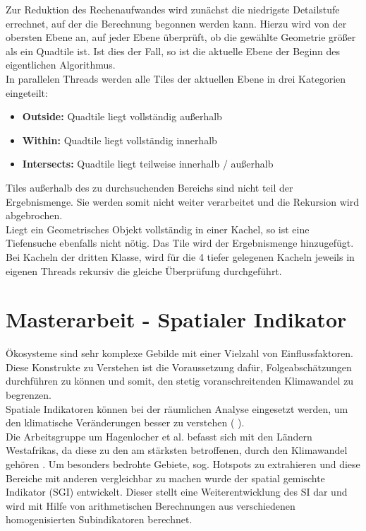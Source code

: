 \documentclass[10pt,conference,compsocconf]{IEEEtran}
\begin{document}
Zur Reduktion des Rechenaufwandes wird zunächst die niedrigste Detailstufe errechnet, auf der die Berechnung begonnen werden kann. Hierzu wird von der obersten Ebene an, auf jeder Ebene überprüft, ob die gewählte Geometrie größer als ein Quadtile ist. Ist dies der Fall, so ist die aktuelle Ebene der Beginn des eigentlichen Algorithmus.\\
In parallelen Threads werden alle Tiles der aktuellen Ebene in drei Kategorien eingeteilt:
\begin{itemize}
	\item \textbf{Outside:} Quadtile liegt vollständig außerhalb
	\item \textbf{Within:} Quadtile liegt vollständig innerhalb
	\item \textbf{Intersects:} Quadtile liegt teilweise innerhalb / außerhalb
\end{itemize}
Tiles außerhalb des zu durchsuchenden Bereichs sind nicht teil der Ergebnismenge. Sie werden somit nicht weiter verarbeitet und die Rekursion wird abgebrochen.\\
Liegt ein Geometrisches Objekt vollständig in einer Kachel, so ist eine Tiefensuche ebenfalls nicht nötig. Das Tile wird der Ergebnismenge hinzugefügt.\\
Bei Kacheln der dritten Klasse, wird für die 4 tiefer gelegenen Kacheln jeweils in eigenen Threads rekursiv die gleiche Überprüfung durchgeführt.\\



\section{Masterarbeit - Spatialer Indikator}
Ökosysteme sind sehr komplexe Gebilde mit einer Vielzahl von Einflussfaktoren. Diese Konstrukte zu Verstehen ist die Voraussetzung dafür, Folgeabschätzungen durchführen zu können und somit, den stetig voranschreitenden Klimawandel zu begrenzen.\\
Spatiale Indikatoren können bei der räumlichen Analyse eingesetzt werden, um den klimatische Veränderungen besser zu verstehen (\cite{cline2014early} \cite{costa2014fragmentation} \cite{mattingly2014housing}).\\
Die Arbeitsgruppe um Hagenlocher et al. \cite{hagenlocher2014modeling} befasst sich mit den Ländern Westafrikas, da diese zu den am stärksten betroffenen, durch den Klimawandel gehören \cite{hamro2014livelihood}. Um besonders bedrohte Gebiete, sog. Hotspots zu extrahieren und diese Bereiche mit anderen vergleichbar zu machen wurde der spatial gemischte Indikator (SGI) entwickelt. Dieser stellt eine Weiterentwicklung des SI dar und wird mit Hilfe von arithmetischen Berechnungen aus verschiedenen homogenisierten Subindikatoren berechnet.\\
\end{document}
